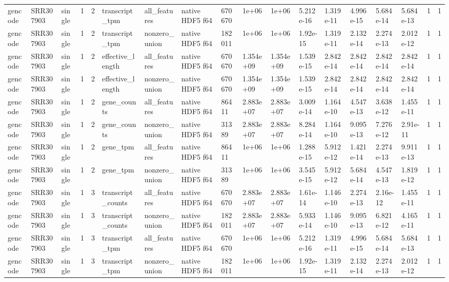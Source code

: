 \begin{tabular}{llllllllllllllllll}
gencode & SRR307903 & single & 1 & 2 & transcript\_tpm & all\_features & native HDF5 f64 & 670670 & 1e+06 & 1e+06 & 5.212e-16 & 1.319e-11 & 4.996e-15 & 5.684e-14 & 5.684e-13 & 1 & 1 \\
gencode & SRR307903 & single & 1 & 2 & transcript\_tpm & nonzero\_union & native HDF5 f64 & 182011 & 1e+06 & 1e+06 & 1.92e-15 & 1.319e-11 & 2.132e-14 & 2.274e-13 & 2.012e-12 & 1 & 1 \\
gencode & SRR307903 & single & 1 & 2 & effective\_length & all\_features & native HDF5 f64 & 670670 & 1.354e+09 & 1.354e+09 & 1.539e-15 & 2.842e-14 & 2.842e-14 & 2.842e-14 & 2.842e-14 & 1 & 1 \\
gencode & SRR307903 & single & 1 & 2 & effective\_length & nonzero\_union & native HDF5 f64 & 670670 & 1.354e+09 & 1.354e+09 & 1.539e-15 & 2.842e-14 & 2.842e-14 & 2.842e-14 & 2.842e-14 & 1 & 1 \\
gencode & SRR307903 & single & 1 & 2 & gene\_counts & all\_features & native HDF5 f64 & 86411 & 2.883e+07 & 2.883e+07 & 3.009e-14 & 1.164e-10 & 4.547e-13 & 3.638e-12 & 1.455e-11 & 1 & 1 \\
gencode & SRR307903 & single & 1 & 2 & gene\_counts & nonzero\_union & native HDF5 f64 & 31389 & 2.883e+07 & 2.883e+07 & 8.284e-14 & 1.164e-10 & 9.095e-13 & 7.276e-12 & 2.91e-11 & 1 & 1 \\
gencode & SRR307903 & single & 1 & 2 & gene\_tpm & all\_features & native HDF5 f64 & 86411 & 1e+06 & 1e+06 & 1.288e-15 & 5.912e-12 & 1.421e-14 & 2.274e-13 & 9.911e-13 & 1 & 1 \\
gencode & SRR307903 & single & 1 & 2 & gene\_tpm & nonzero\_union & native HDF5 f64 & 31389 & 1e+06 & 1e+06 & 3.545e-15 & 5.912e-12 & 5.684e-14 & 4.547e-13 & 1.819e-12 & 1 & 1 \\
gencode & SRR307903 & single & 1 & 3 & transcript\_counts & all\_features & native HDF5 f64 & 670670 & 2.883e+07 & 2.883e+07 & 1.61e-14 & 1.146e-10 & 2.274e-13 & 2.16e-12 & 1.455e-11 & 1 & 1 \\
gencode & SRR307903 & single & 1 & 3 & transcript\_counts & nonzero\_union & native HDF5 f64 & 182011 & 2.883e+07 & 2.883e+07 & 5.933e-14 & 1.146e-10 & 9.095e-13 & 6.821e-12 & 4.165e-11 & 1 & 1 \\
gencode & SRR307903 & single & 1 & 3 & transcript\_tpm & all\_features & native HDF5 f64 & 670670 & 1e+06 & 1e+06 & 5.212e-16 & 1.319e-11 & 4.996e-15 & 5.684e-14 & 5.684e-13 & 1 & 1 \\
gencode & SRR307903 & single & 1 & 3 & transcript\_tpm & nonzero\_union & native HDF5 f64 & 182011 & 1e+06 & 1e+06 & 1.92e-15 & 1.319e-11 & 2.132e-14 & 2.274e-13 & 2.012e-12 & 1 & 1 \\

\end{tabular}
